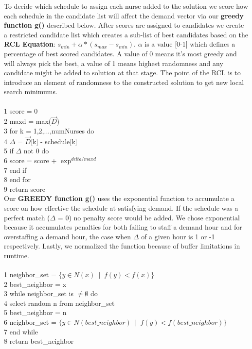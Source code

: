 \documentclass[11pt]{article}
\begin{document}
{To decide which schedule to assign each nurse added to the solution we score how each schedule in the candidate list will
affect the demand vector via our {\bf greedy function g()} described below. After scores are assigned to candidates
we create a restricted candidate list which creates a sub-list of best candidates based on the {\bf RCL Equation}: 
$s_{min} + \alpha*(s_{max}-s_{min})$. $\alpha$ is a value [0-1] which defines a percentage of best scored candidates. A value
of 0 means it's most greedy and will always pick the best, a value of 1 means highest randomness and any candidate might be added to solution
at that stage. The point of the RCL is to introduce an element of randomness to the constructed solution to get new local search minimums.\\

\\
1  score = 0\\
2  maxd = max($\vec{D}$)\\
3  for k = 1,2,...,numNurses do\\
4\hspace*{.4cm} $\Delta$ = $\vec{D}$[k] - schedule[k]\\
5\hspace*{.4cm} if $\Delta$ not 0 do\\
6\hspace*{.6cm} score = score + $\exp^{delta/maxd}$\\
7\hspace*{.4cm} end if\\
8  end for\\
9  return score\\

Our {\bf GREEDY function g()} uses the exponential function to accumulate a score on how effective the schedule at satisfying demand.
If the schedule was a perfect match ($\Delta$ = 0) no penalty score would be added. We chose exponential because it accumulates penalties for both failing to staff a demand
hour and for overstaffing a demand hour, the case when $\Delta$ of a given hour is 1 or -1 respectively. Lastly, we normalized the function because of buffer limitations in runtime.\\

\\
1  neighbor\_set = $\{y \in N(x) \phantom{a}|\phantom{a} f(y) < f(x)\}$\\
2  best\_neighbor = x\\
3  while neighbor\_set is $\ne \emptyset$ do\\
4\hspace*{.4cm} select random n from neighbor\_set\\
5\hspace*{.4cm} best\_neighbor = n\\
6\hspace*{.4cm} neighbor\_set = $\{y \in N(best\_neighbor) \phantom{a}|\phantom{a} f(y) < f(best\_neighbor)\}$\\
7  end while\\
8  return best\_neighbor\\

}
\end{document}
